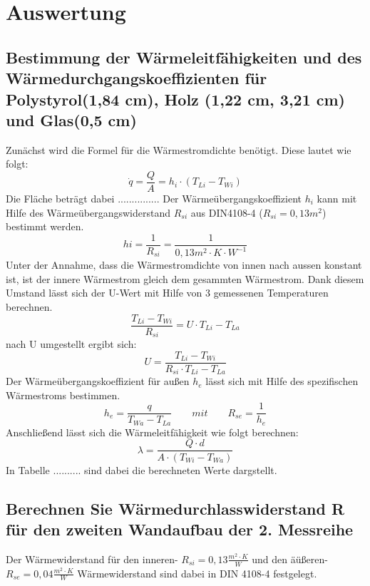 \section{Auswertung}
\subsection{Bestimmung der Wärmeleitfähigkeiten und des Wärmedurchgangskoeffizienten für Polystyrol(1,84 cm), Holz (1,22 cm, 3,21 cm) und  Glas(0,5 cm)}
Zunächst wird die Formel für die Wärmestromdichte benötigt. Diese lautet wie folgt:
\begin{equation}
\dot q=\frac{ Q }{ A }=h_{ i }\cdot(T_{ Li }-T_{Wi })
  \label{eq:230514_Wärmestromdichte}
\end{equation}
Die Fläche beträgt dabei ............... Der Wärmeübergangskoeffizient $h_{i}$ kann mit Hilfe des Wärmeübergangswiderstand $R_{si}$ aus DIN4108-4 ($R_{si}=0,13 m^2$) bestimmt werden.
\begin{equation}
hi=\frac{ 1 }{ R_{ si } }=\frac{ 1 }{ 0,13m^2\cdot K \cdot W^{-1} }
  \label{eq:230514_Wärmeübergangskoeffizient}
\end{equation}
Unter der Annahme, dass die Wärmestromdichte von innen nach aussen konstant ist, ist der innere Wärmestrom gleich dem gesammten Wärmestrom. Dank diesem Umstand lässt sich der U-Wert mit Hilfe von 3 gemessenen Temperaturen berechnen.
\begin{equation}
\frac{ T_{Li} - T_{Wi}}{ R_{ si } }=U \cdot T_{Li} - T_{La}
  \label{eq:230514_u1}
\end{equation}
nach U umgestellt ergibt sich: 
\begin{equation}
U = \frac{ T_{Li} - T_{Wi}}{ R_{ si } \cdot  T_{Li} - T_{La}}
  \label{eq:230514_u2}
\end{equation}
Der Wärmeübergangskoeffizient für außen $h_{e}$ lässt sich mit Hilfe des spezifischen Wärmestroms bestimmen. 
\begin{equation}
h_{e}=\frac{ q }{ T_{Wa} - T_{La} }   \qquad  mit     \qquad       R_{se}=\frac{ 1 }{ h_{e} }
  \label{eq:230514_h_e}
\end{equation}
Anschließend lässt sich die Wärmeleitfähigkeit wie folgt berechnen:
\begin{equation}
\lambda=\frac{ Q \cdot d }{ A \cdot ( T_{Wi} - T_{Wa} )}
  \label{eq:230514_lamda}
\end{equation}
In Tabelle ..........  sind dabei die berechneten Werte dargstellt.
\subsection{Berechnen Sie Wärmedurchlasswiderstand R für den zweiten Wandaufbau der 2. Messreihe}
Der Wärmewiderstand für den inneren- $R_{si}=0,13\frac{ m^2 \cdot K }{W} $ und den äüßeren- $R_{se}=0,04 \frac{ m^2 \cdot K }{W}$ Wärmewiderstand sind dabei in DIN 4108-4 festgelegt.